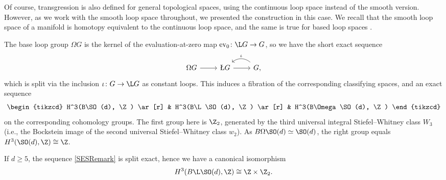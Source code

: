 \begin{Remark}
Of course, transgression is also defined for general topological spaces, using the continuous loop space instead of the smooth version.
However, as we work with the smooth loop space throughout, we presented the construction in this case.
We recall that the smooth loop space of a manifold is homotopy equivalent to the continuous loop space, and the same is true for based loop spaces \cite[Proposition~7.1]{CareyCrowleyMurray}.
\end{Remark}



The base loop group $\Omega G$ is the kernel of the evaluation-at-zero map $\mathrm{ev}_0\colon \L G \to G$, so we have the short exact sequence
\begin{equation} \label{PathSequence}
 \begin{tikzcd}
 \Omega G \ar[r] & \L G \ar[r] & G \ar[l, bend right=40, "\iota"'],
\end{tikzcd}
\end{equation}
which is split via the inclusion $\iota\colon G \to \L G$ as constant loops.
This induces a fibration of the corresponding classifying spaces, and an exact sequence
\begin{equation} \label{SESRemark}
\begin{tikzcd}
H^3(B\SO(d), \Z) \ar[r] & H^3(B\L\SO(d), \Z) \ar[r] & H^3(B\Omega\SO(d), \Z)
\end{tikzcd}
\end{equation}
on the corresponding cohomology groups.
The first group here is $\Z_2$, generated by the third universal integral Stiefel--Whitney class $W_3$ (i.e., the Bockstein image of the second universal Stiefel--Whitney class $w_2$).
As $B\Omega\SO(d) \simeq \SO(d)$, the right group equals $H^3(\SO(d), \Z) \cong \Z$.

\begin{Lemma} \label{LemmaH3BLSOZ}
If $d \geq 5$, the sequence \eqref{SESRemark} is split exact, hence we have a canonical isomorphism
\begin{equation*}
 H^3(B\L\SO(d), \Z) \cong \Z \times \Z_2.
\end{equation*}
\end{Lemma}

